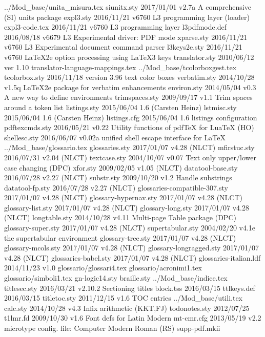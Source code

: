 ../Mod_base/unita_misura.tex
 siunitx.sty    2017/01/01 v2.7a A comprehensive (SI) units package
   expl3.sty    2016/11/21 v6760 L3 programming layer (loader) 
expl3-code.tex    2016/11/21 v6760 L3 programming layer 
l3pdfmode.def    2016/08/18 v6679 L3 Experimental driver: PDF mode
  xparse.sty    2016/11/21 v6760 L3 Experimental document command parser
l3keys2e.sty    2016/11/21 v6760 LaTeX2e option processing using LaTeX3 keys
translator.sty    2010/06/12 ver 1.10
translator-language-mappings.tex
../Mod_base/tcolorboxgest.tex
tcolorbox.sty    2016/11/18 version 3.96 text color boxes
verbatim.sty    2014/10/28 v1.5q LaTeX2e package for verbatim enhancements
 environ.sty    2014/05/04 v0.3 A new way to define environments
trimspaces.sty    2009/09/17 v1.1 Trim spaces around a token list
listings.sty    2015/06/04 1.6 (Carsten Heinz)
 lstmisc.sty    2015/06/04 1.6 (Carsten Heinz)
listings.cfg    2015/06/04 1.6 listings configuration
pdftexcmds.sty    2016/05/21 v0.22 Utility functions of pdfTeX for LuaTeX (HO)
shellesc.sty    2016/06/07 v0.02a unified shell escape interface for LaTeX
../Mod_base/glossario.tex
glossaries.sty    2017/01/07 v4.28 (NLCT)
mfirstuc.sty    2016/07/31 v2.04 (NLCT)
textcase.sty    2004/10/07 v0.07 Text only upper/lower case changing (DPC)
    xfor.sty    2009/02/05 v1.05 (NLCT)
datatool-base.sty    2016/07/28 v2.27 (NLCT)
  substr.sty    2009/10/20 v1.2 Handle substrings
datatool-fp.sty    2016/07/28 v2.27 (NLCT)
glossaries-compatible-307.sty    2017/01/07 v4.28 (NLCT)
glossary-hypernav.sty    2017/01/07 v4.28 (NLCT)
glossary-list.sty    2017/01/07 v4.28 (NLCT)
glossary-long.sty    2017/01/07 v4.28 (NLCT)
longtable.sty    2014/10/28 v4.11 Multi-page Table package (DPC)
glossary-super.sty    2017/01/07 v4.28 (NLCT)
supertabular.sty    2004/02/20 v4.1e the supertabular environment
glossary-tree.sty    2017/01/07 v4.28 (NLCT)
glossary-mcols.sty    2017/01/07 v4.28 (NLCT)
glossary-longragged.sty    2017/01/07 v4.28 (NLCT)
glossaries-babel.sty    2017/01/07 v4.28 (NLCT)
glossaries-italian.ldf    2014/11/23 v1.0
glossario/glossari4.tex
glossario/acronimi1.tex
glossario/simboli1.tex
gn-logic14.sty    
 braille.sty    
../Mod_base/indice.tex
titlesec.sty    2016/03/21 v2.10.2 Sectioning titles
   block.tss    2016/03/15
 ttlkeys.def    2016/03/15
titletoc.sty    2011/12/15 v1.6 TOC entries
../Mod_base/utili.tex
    calc.sty    2014/10/28 v4.3 Infix arithmetic (KKT,FJ)
todonotes.sty    2012/07/25
   t1lmr.fd    2009/10/30 v1.6 Font defs for Latin Modern
  mt-cmr.cfg    2013/05/19 v2.2 microtype config. file: Computer Modern Roman (RS)
supp-pdf.mkii

